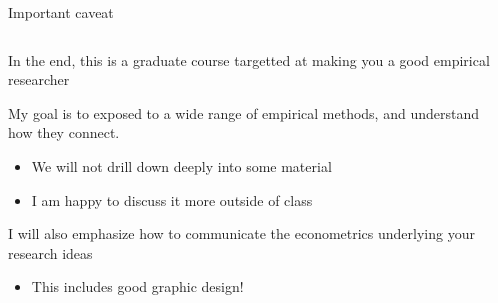 \documentclass[notes,11pt, aspectratio=169]{beamer}
\newenvironment{wideitemize}{\itemize\addtolength{\itemsep}{10pt}}{\enditemize}
\begin{document}
\begin{frame}{Important caveat}
\begin{columns}[T] %
\begin{column}{.7\textwidth}
  \begin{wideitemize}
  \item In the end, this is a graduate course targetted at making you a good empirical researcher
  \item My goal is to exposed to a wide range of empirical methods,
    and understand how they connect.
    \begin{itemize}
    \item We will not drill down deeply into some material
    \item I am happy to discuss it more outside of class
    \end{itemize}
  \item I will also emphasize how to communicate the econometrics underlying your research ideas
    \begin{itemize}
    \item This includes good graphic design!
    \end{itemize}
  \end{wideitemize}
\end{column}%
\hfill%
\begin{column}{.38\textwidth}
  \makebox[\linewidth][c]{
    \resizebox{\linewidth}{!}{
    }
  }
\end{column}%
\end{columns}
\end{frame}
\end{document}

